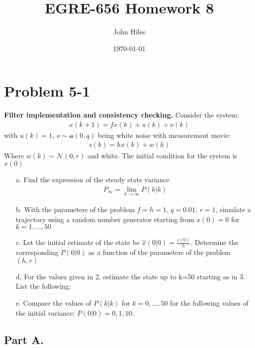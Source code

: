 \documentclass{article}
\title{EGRE-656 Homework 8}
\author{John Hiles}
\date\today
\begin{document}
\maketitle %

\section*{Problem 5-1}
\textbf{Filter implementation and consistency checking.}
Consider the system:
\begin{align*}
x(k+1) = f x(k) + u(k) + \nu(k)
\end{align*}
with $u(k)=1$, $\nu \sim \mathcal{n}(0,q)$ being white noise with measurement movie:
\begin{align*}
z(k) = h x(k) + w(k)
\end{align*}
Where $w(k) \sim \mathcal{N}(0,r)$ and white. The initial condition for the system is $x(0)$
\begin{enumerate}
\item[a.] Find the expression of the steady state variance
\begin{align*}
P_{\infty} = \lim_{k \rightarrow \infty} P(k|k)
\end{align*}
\item[b.] With the parameters of the problem $f=h=1$, $q=0.01$, $r=1$, simulate a trajectory using a random number generator starting from $x(0)=0$ for $k=1,...,50$
\item[c.] Let the initial estimate of the state be $\hat{x}(0|0)=\frac{z(0)}{h}$. Determine the corresponding $P(0|0)$ as a function of the parameters of the problem $(h,r)$
\item[d.] For the values given in 2, estimate the state up to k=50 starting as in 3. List the following:
\item[e.] Compare the values of $P(k|k)$ for $k=0,...,50$ for the following values of the initial variance: $P(0|0) = 0,1,10$.
\end{enumerate}

\subsection*{Part A.}
\end{document}
